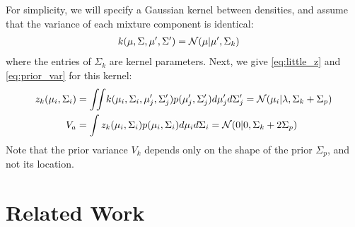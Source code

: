 %
%
For simplicity, we will specify a Gaussian kernel between densities, and assume that the variance of each mixture component is identical:  %
%
\begin{align}
k( \mu, \Sigma, \mu', \Sigma') & = \mathcal{N}\!\left(\mu \middle| \mu',\Sigma_k\right)
\end{align}
%
where the entries of $\Sigma_k$ are kernel parameters.  Next, we give \eqref{eq:little_z} and \eqref{eq:prior_var} for this kernel:
%
\begin{align}
z_k(\mu_i, \Sigma_i) & = \int\!\!\! \int\! k(\mu_i, \Sigma_i, \mu_j', \Sigma_j') p(\mu_j', \Sigma_j') d\mu_j' d\Sigma_j'
 = \N{\mu_i}{\lambda}{\Sigma_k + \Sigma_p} \label{eq:little_z_gmm} \\
%
%
%
%
%
V_a & = \int z_k(\mu_i, \Sigma_i) p(\mu_i, \Sigma_i) d\mu_i d\Sigma_i
 = \N{0}{0}{\Sigma_k + 2 \Sigma_p}
\label{eq:prior_variance_gmm}
\end{align}
%
Note that the prior variance $V_k$ depends only on the shape of the prior $\Sigma_p$, and not its location.


\section{Related Work}

